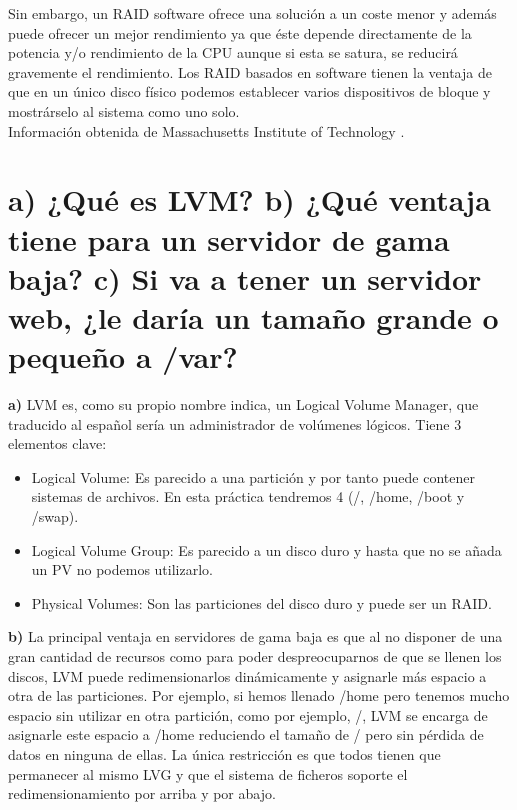 Sin embargo, un RAID software ofrece una solución a un coste menor y además puede ofrecer un mejor rendimiento ya que éste depende directamente de la potencia y/o rendimiento de la CPU aunque si esta se satura, se reducirá gravemente el rendimiento. Los RAID basados en software tienen la ventaja de que en un único disco físico podemos establecer varios dispositivos de bloque y mostrárselo al sistema como uno solo. \\

Información obtenida de Massachusetts Institute of Technology \cite{mitraid}.


\section{a) ¿Qué es LVM? \newline b) ¿Qué ventaja tiene para un servidor de gama baja? \newline  c) Si va a tener un servidor web, ¿le daría un tamaño grande o pequeño a /var?}
\textbf{a)} LVM \cite{LVM} es, como su propio nombre indica, un Logical Volume Manager, que traducido al español sería un administrador de volúmenes lógicos. Tiene 3 elementos clave:\\
\begin{itemize}
	\item Logical Volume: Es parecido a una partición y por tanto puede contener sistemas de archivos. En esta práctica tendremos 4 (/, /home, /boot y /swap).
	\item Logical Volume Group: Es parecido a un disco duro y hasta que no se añada un PV no podemos utilizarlo.
	\item Physical Volumes: Son las particiones del disco duro y puede ser un RAID.
\end{itemize}


\textbf{b)} La principal ventaja en servidores de gama baja \cite{lvmlowcost} es que al no disponer de una gran cantidad de recursos como para poder despreocuparnos de que se llenen los discos, LVM puede redimensionarlos dinámicamente y asignarle más espacio a otra de las particiones. Por ejemplo, si hemos llenado /home pero tenemos mucho espacio sin utilizar en otra partición, como por ejemplo, /, LVM se encarga de asignarle este espacio a /home reduciendo el tamaño de / pero sin pérdida de datos en ninguna de ellas. La única restricción es que todos tienen que permanecer al mismo LVG y que el sistema de ficheros soporte el redimensionamiento por arriba y por abajo.\\

